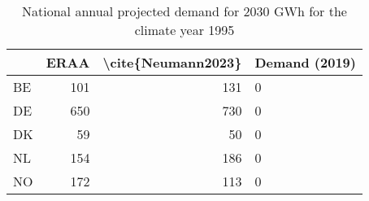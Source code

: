\begin{table}
\centering
\caption{National annual projected demand for 2030  GWh for the climate year 1995}
\begin{tabular}{lrrl}
\toprule
{} &  ERAA &  \textbackslash cite\{Neumann2023\} & Demand (2019) \\
\midrule
BE &   101 &                 131 &             0 \\
DE &   650 &                 730 &             0 \\
DK &    59 &                  50 &             0 \\
NL &   154 &                 186 &             0 \\
NO &   172 &                 113 &             0 \\
\bottomrule
\end{tabular}
\end{table}
